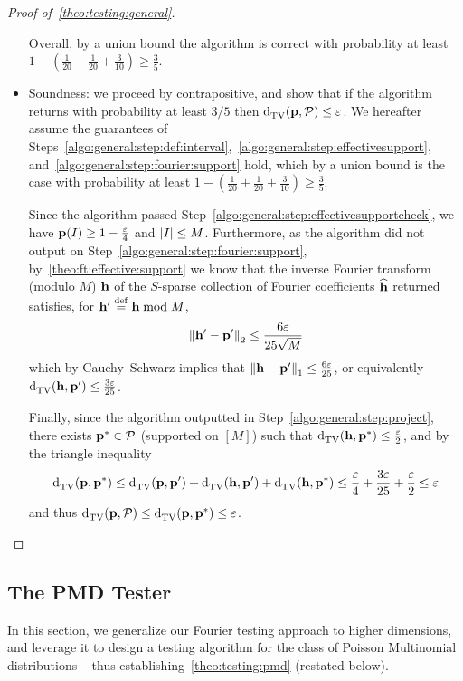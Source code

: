 \begin{proof}[Proof of~\cref{theo:testing:general}]
\begin{itemize}
      Overall, by a union bound the algorithm is correct with probability at least $1-(\frac{1}{20}+\frac{1}{20}+\frac{3}{10}) \geq \frac{3}{5}$.
      
      \item Soundness: we proceed by contrapositive, and show that if the algorithm returns \accept with probability at least $3/5$ then $ {\operatorname{d}_{\textrm{TV}}^{}\!\left({\mathbf{p}, \mathcal{P}}\right)} \leq \varepsilon$. 
We hereafter assume the guarantees of Steps~\ref{algo:general:step:def:interval},~\ref{algo:general:step:effectivesupport}, and~\ref{algo:general:step:fourier:support} hold, which by a union bound is the case with probability at least $1-(\frac{1}{20}+\frac{1}{20}+\frac{3}{10}) \geq \frac{3}{5}$.

Since the algorithm passed Step~\ref{algo:general:step:effectivesupportcheck}, we have $\mathbf{p}(I)\geq 1 - \frac{\varepsilon}{4}$ and $\left\lvert I \right\rvert\leq M$. Furthermore, as the algorithm did not output \reject on Step~\ref{algo:general:step:fourier:support}, by~\cref{theo:ft:effective:support} we know that the inverse Fourier transform (modulo $M$) $\mathbf{h}$ of the $S$-sparse collection of Fourier coefficients $\widehat{\mathbf{h}}$ returned satisfies, for $\mathbf{h}'\stackrel{\rm def}{=} \mathbf{h} \bmod M$,
  \[
       {\lVert\mathbf{h}'-\mathbf{p}'{\rVert}}_2 \leq \frac{6\varepsilon}{25\sqrt{M}}
  \]
  which by Cauchy--Schwarz implies that ${\lVert\mathbf{h}-\mathbf{p}'{\rVert}}_1\leq \frac{6\varepsilon}{25}$, or equivalently ${\operatorname{d}_{\textrm{TV}}^{}\!\left({\mathbf{h}, \mathbf{p}'}\right)}\leq \frac{3\varepsilon}{25}$.
  
  Finally, since the algorithm outputted \accept in Step~\ref{algo:general:step:project}, there exists $\mathbf{p}^\ast\in\mathcal{P}$ (supported on $[M]$) such that ${\operatorname{d}_{\textrm{TV}}^{}\!\left({\mathbf{h}, \mathbf{p}^\ast}\right)}\leq \frac{\varepsilon}{2}$, and by the triangle inequality
  \[
      {\operatorname{d}_{\textrm{TV}}^{}\!\left({\mathbf{p}, \mathbf{p}^\ast}\right)} \leq {\operatorname{d}_{\textrm{TV}}^{}\!\left({\ensuremath{\mathbf{p}}, \ensuremath{\mathbf{p}}'}\right)} + {\operatorname{d}_{\textrm{TV}}^{}\!\left({\mathbf{h}, \mathbf{p}'}\right)} + {\operatorname{d}_{\textrm{TV}}^{}\!\left({\mathbf{h}, \mathbf{p}^\ast}\right)} \leq \frac{\varepsilon}{4} + \frac{3\varepsilon}{25} + \frac{\varepsilon}{2} \leq \varepsilon
  \]
  and thus $ {\operatorname{d}_{\textrm{TV}}^{}\!\left({\mathbf{p}, \mathcal{P}}\right)} \leq {\operatorname{d}_{\textrm{TV}}^{}\!\left({\ensuremath{\mathbf{p}}, \ensuremath{\mathbf{p}}^\ast}\right)} \leq \varepsilon$.
      
  \end{itemize}
\end{proof}

 
\subsection{The PMD Tester}\label{sec:pmd:testing}
In this section, we generalize our Fourier testing approach to higher dimensions, and leverage it to design a testing algorithm for the class of Poisson Multinomial distributions -- thus establishing~\cref{theo:testing:pmd} (restated below).

